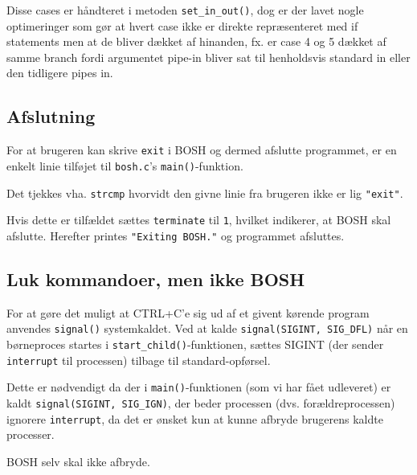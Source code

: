 Disse cases er håndteret i metoden \verb+set_in_out()+, dog er der lavet nogle optimeringer som gør at hvert case ikke er direkte repræsenteret med if statements men at de bliver dækket af hinanden, fx. er case 4 og 5 dækket af samme branch fordi argumentet pipe-in bliver sat til henholdsvis standard in eller den tidligere pipes in.
\subsection{Afslutning}
For at brugeren kan skrive \verb+exit+ i BOSH og dermed afslutte programmet, er en enkelt linie tilføjet til \verb+bosh.c+'s \verb+main()+-funktion. 

Det tjekkes vha. \verb+strcmp+ hvorvidt den givne linie fra brugeren ikke er lig \verb+"exit"+.

Hvis dette er tilfældet sættes \verb+terminate+ til \verb+1+, hvilket indikerer, at BOSH skal afslutte. Herefter printes \verb+"Exiting BOSH."+ og programmet afsluttes. 
\subsection{Luk kommandoer, men ikke BOSH}
For at gøre det muligt at CTRL+C'e sig ud af et givent kørende program anvendes \verb+signal()+ systemkaldet. Ved at kalde \verb+signal(SIGINT, SIG_DFL)+ når en børneproces startes i \verb+start_child()+-funktionen, sættes SIGINT (der sender \verb+interrupt+ til processen) tilbage til standard-opførsel.

Dette er nødvendigt da der i \verb+main()+-funktionen (som vi har fået udleveret) er kaldt \verb+signal(SIGINT, SIG_IGN)+, der beder processen (dvs. forældreprocessen) ignorere \verb+interrupt+, da det er ønsket kun at kunne afbryde brugerens kaldte processer. 

BOSH selv skal ikke afbryde.
